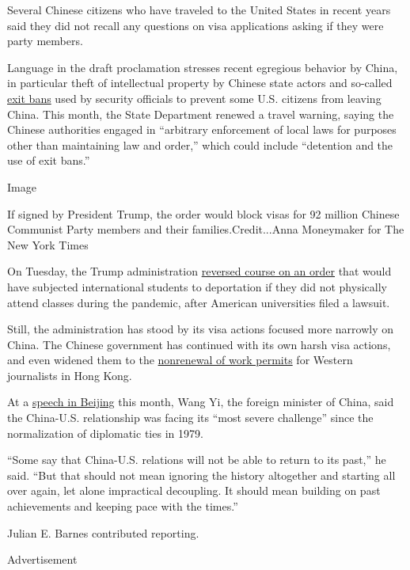 Several Chinese citizens who have traveled to the United States in
recent years said they did not recall any questions on visa applications
asking if they were party members.

Language in the draft proclamation stresses recent egregious behavior by
China, in particular theft of intellectual property by Chinese state
actors and so-called
\href{https://www.nytimes.com/2018/11/25/us/politics/china-exit-ban.html}{exit
bans} used by security officials to prevent some U.S. citizens from
leaving China. This month, the State Department renewed a travel
warning, saying the Chinese authorities engaged in ``arbitrary
enforcement of local laws for purposes other than maintaining law and
order,'' which could include ``detention and the use of exit bans.''

Image

If signed by President Trump, the order would block visas for 92 million
Chinese Communist Party members and their families.Credit...Anna
Moneymaker for The New York Times

On Tuesday, the Trump administration
\href{https://www.nytimes.com/2020/07/14/us/coronavirus-international-foreign-student-visas.html}{reversed
course on an order} that would have subjected international students to
deportation if they did not physically attend classes during the
pandemic, after American universities filed a lawsuit.

Still, the administration has stood by its visa actions focused more
narrowly on China. The Chinese government has continued with its own
harsh visa actions, and even widened them to the
\href{https://www.nytimes.com/2020/07/14/business/media/new-york-times-hong-kong.html}{nonrenewal
of work permits} for Western journalists in Hong Kong.

At a
\href{https://www.fmprc.gov.cn/mfa_eng/zxxx_662805/t1796302.shtml}{speech
in Beijing} this month, Wang Yi, the foreign minister of China, said the
China-U.S. relationship was facing its ``most severe challenge'' since
the normalization of diplomatic ties in 1979.

``Some say that China-U.S. relations will not be able to return to its
past,'' he said. ``But that should not mean ignoring the history
altogether and starting all over again, let alone impractical
decoupling. It should mean building on past achievements and keeping
pace with the times.''

Julian E. Barnes contributed reporting.

Advertisement


